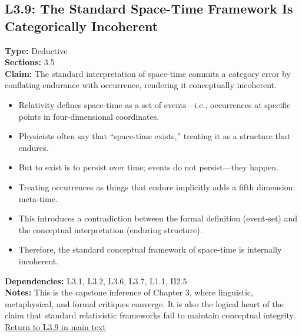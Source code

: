 \documentclass[12pt]{book}
\newcommand{\returnlink}[1]{\hyperref[logic:#1]{Return to #1 in main text}\xspace}
\begin{document}
\subsection*{L3.9: The Standard Space-Time Framework Is Categorically Incoherent}\label{appendix:L3.9}
\textbf{Type:} Deductive \\
\textbf{Sections:} 3.5 \\
\textbf{Claim:} The standard interpretation of space-time commits a category error by conflating endurance with occurrence, rendering it conceptually incoherent.
\begin{itemize}
  \item Relativity defines space-time as a set of events---i.e., occurrences at specific points in four-dimensional coordinates.
  \item Physicists often say that ``space-time exists,'' treating it as a structure that endures.
  \item But to exist is to persist over time; events do not persist---they happen.
  \item Treating occurrences as things that endure implicitly adds a fifth dimension: meta-time.
  \item This introduces a contradiction between the formal definition (event-set) and the conceptual interpretation (enduring structure).
  \item Therefore, the standard conceptual framework of space-time is internally incoherent.
\end{itemize}
\textbf{Dependencies:} L3.1, L3.2, L3.6, L3.7, L1.1, II2.5 \\
\textbf{Notes:} This is the capstone inference of Chapter 3, where linguistic, metaphysical, and formal critiques converge. It is also the logical heart of the claim that standard relativistic frameworks fail to maintain conceptual integrity.\\
\returnlink{L3.9}
\end{document}
